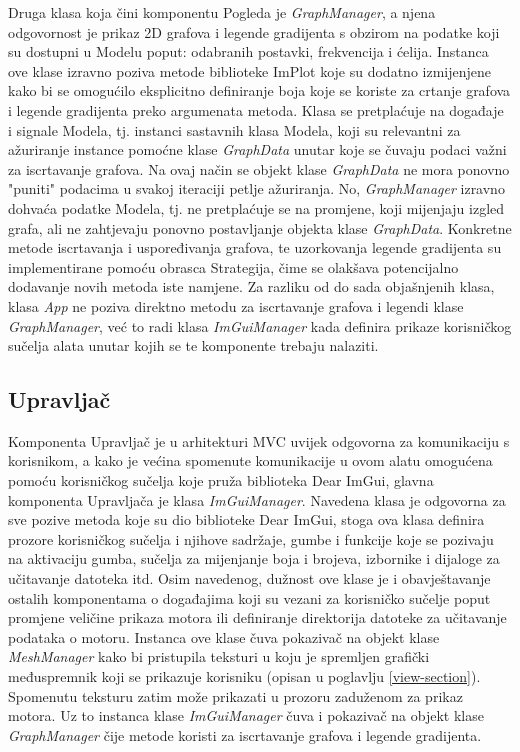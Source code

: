 \documentclass[times, utf8, diplomski]{fer}
\begin{document}
Druga klasa koja čini komponentu Pogleda je \textit{GraphManager}, a njena odgovornost je prikaz 2D grafova i legende gradijenta s obzirom na podatke koji su dostupni u Modelu poput: odabranih postavki, frekvencija i ćelija. Instanca ove klase izravno poziva metode biblioteke ImPlot koje su dodatno izmijenjene kako bi se omogućilo eksplicitno definiranje boja koje se koriste za crtanje grafova i legende gradijenta preko argumenata metoda. Klasa se pretplaćuje na događaje i signale Modela, tj. instanci sastavnih klasa Modela, koji su relevantni za ažuriranje instance pomoćne klase \textit{GraphData} unutar koje se čuvaju podaci važni za iscrtavanje grafova. Na ovaj način se objekt klase \textit{GraphData} ne mora ponovno "puniti" podacima u svakoj iteraciji petlje ažuriranja. No, \textit{GraphManager} izravno dohvaća podatke Modela, tj. ne pretplaćuje se na promjene, koji mijenjaju izgled grafa, ali ne zahtjevaju ponovno postavljanje objekta klase \textit{GraphData}. Konkretne metode iscrtavanja i uspoređivanja grafova, te uzorkovanja legende gradijenta su implementirane pomoću obrasca Strategija, čime se olakšava potencijalno dodavanje novih metoda iste namjene. Za razliku od do sada objašnjenih klasa, klasa \textit{App} ne poziva direktno metodu za iscrtavanje grafova i legendi klase \textit{GraphManager}, već to radi klasa \textit{ImGuiManager} kada definira prikaze korisničkog sučelja alata unutar kojih se te komponente trebaju nalaziti.\\

\subsection{Upravljač}

Komponenta Upravljač je u arhitekturi MVC uvijek odgovorna za komunikaciju s korisnikom, a kako je većina spomenute komunikacije u ovom alatu omogućena pomoću korisničkog sučelja koje pruža biblioteka Dear ImGui, glavna komponenta Upravljača je klasa \textit{ImGuiManager}. Navedena klasa je odgovorna za sve pozive metoda koje su dio biblioteke Dear ImGui, stoga ova klasa definira prozore korisničkog sučelja i njihove sadržaje, gumbe i funkcije koje se pozivaju na aktivaciju gumba, sučelja za mijenjanje boja i brojeva, izbornike i dijaloge za učitavanje datoteka itd. Osim navedenog, dužnost ove klase je i obavještavanje ostalih komponentama o događajima koji su vezani za korisničko sučelje poput promjene veličine prikaza motora ili definiranje direktorija datoteke za učitavanje podataka o motoru. Instanca ove klase čuva pokazivač na objekt klase \textit{MeshManager} kako bi pristupila teksturi u koju je spremljen grafički međuspremnik koji se prikazuje korisniku (opisan u poglavlju \ref{view-section}). Spomenutu teksturu zatim može prikazati u prozoru zaduženom za prikaz motora. Uz to instanca klase \textit{ImGuiManager} čuva i pokazivač na objekt klase \textit{GraphManager} čije metode koristi za iscrtavanje grafova i legende gradijenta.\\\\
\end{document}
